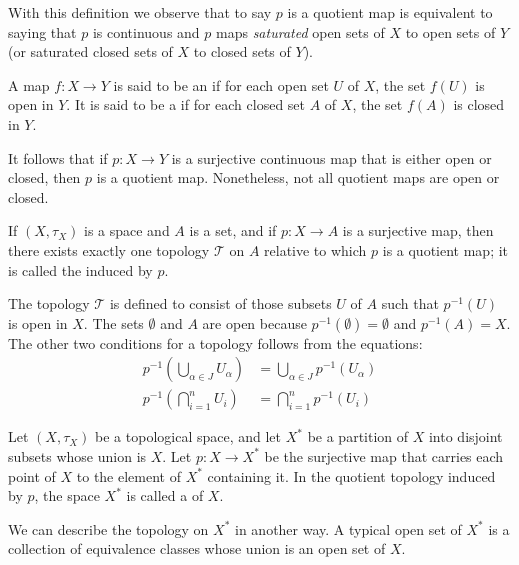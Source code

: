 \documentclass[12pt, a4paper, oneside, openright, titlepage]{book}
\begin{document}
With this definition we observe that to say $p$ is a quotient map is equivalent to saying that $p$ is continuous and $p$ maps \emph{saturated} open sets of $X$ to open sets of $Y$ (or saturated closed sets of $X$ to closed sets of $Y$).

\begin{definition}
    A map $f:X\rightarrow Y$ is said to be an  if for each open set $U$ of $X$, the set $f(U)$ is open in $Y$. It is said to be a  if for each closed set $A$ of $X$, the set $f(A)$ is closed in $Y$.
\end{definition}

It follows that if $p:X\rightarrow Y$ is a surjective continuous map that is either open or closed, then $p$ is a quotient map. Nonetheless, not all quotient maps are open or closed.

\begin{definition}
    If $(X,\tau_X)$ is a space and $A$ is a set, and if $p:X\rightarrow A$ is a surjective map, then there exists exactly one topology $\mathcal{T}$ on $A$ relative to which $p$ is a quotient map; it is called the  induced by $p$.
\end{definition}


The topology $\mathcal{T}$ is defined to consist of those subsets $U$ of $A$ such that $p^{-1}(U)$ is open in $X$. The sets $\emptyset$ and $A$ are open because $p^{-1}(\emptyset) = \emptyset$ and $p^{-1}(A) = X$. The other two conditions for a topology follows from the equations: \begin{align*}
    p^{-1}\left(\bigcup_{\alpha \in J}U_{\alpha}\right) &= \bigcup_{\alpha \in J}p^{-1}(U_{\alpha}) \\
    p^{-1}\left(\bigcap_{i = 1}^nU_i\right) &= \bigcap_{i=1}^np^{-1}(U_i)
\end{align*}


\begin{definition}
    Let $(X,\tau_X)$ be a topological space, and let $X^*$ be a partition of $X$ into disjoint subsets whose union is $X$. Let $p:X\rightarrow X^*$ be the surjective map that carries each point of $X$ to the element of $X^*$ containing it. In the quotient topology induced by $p$, the space $X^*$ is called a  of $X$.
\end{definition}

We can describe the topology on $X^*$ in another way. A typical open set of $X^*$ is a collection of equivalence classes whose union is an open set of $X$.
\end{document}

